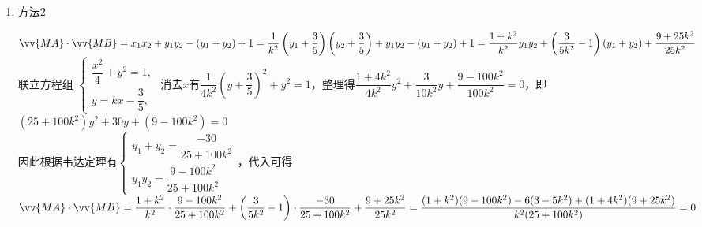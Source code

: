 \begin{enumerate}
\begin{jieda}
\begin{enumerate}
\begin{enumerate}
                $\vv{MA} \cdot \vv{MB} = x_1x_2+(y_1-1)(y_2-1) = x_1x_2+\left(kx_1-\dfrac{8}{5}\right)\left(kx_2-\dfrac{8}{5}\right) = (1+k^2)x_1x_2-\dfrac{8k}{5}(x_1+x_2)+\dfrac{64}{25}$

                联立方程组 $\left\{  \begin{array}{l} \dfrac{{x}^{2}}{4} + {y}^{2} = 1, \\  y = {kx} - \dfrac{3}{5}, \end{array}\right.$ 消去$y$有$x^2+4\left(kx-\dfrac{3}{5}\right) = 4$，整理得$(4k^2+1)x^2-\dfrac{24}{5}kx-\dfrac{64}{25} = 0$

                因此根据韦达定理有$\left\{\begin{array}{l}
                     x_1+x_2 = \dfrac{24k}{5(4k^2+1)} \\
                     x_1x_2 = -\dfrac{64}{25(4k^2+1)}
                \end{array}\right.$，代入可得$\vv{MA} \cdot \vv{MB} =  (1+k^2)x_1x_2-\dfrac{8k}{5}(x_1+x_2)+\dfrac{64}{25} = (1+k^2)\left(-\dfrac{64}{25(4k^2+1)}\right) - \dfrac{8k}{5}\left(\dfrac{24k}{5(4k^2+1)}\right) + \dfrac{64}{25} = 0$
                
            
                \item 方法2
                
                $\vv{MA} \cdot \vv{MB} = x_1x_2 + y_1y_2-(y_1+y_2)+1 = \dfrac{1}{k^2}\left(y_1+\dfrac{3}{5}\right)\left(y_2+\dfrac{3}{5}\right) + y_1y_2-(y_1+y_2)+1 = \dfrac{1+k^2}{k^2}y_1y_2 + \left(\dfrac{3}{5k^2}-1\right)(y_1+y_2)+\dfrac{9+25k^2}{25k^2}$\\
                联立方程组 $\left\{  \begin{array}{l} \dfrac{{x}^{2}}{4} + {y}^{2} = 1, \\  y = {kx} - \dfrac{3}{5}, \end{array}\right.$ 消去$x$有$\dfrac{1}{4k^2}\left(y+\dfrac{3}{5}\right)^2+y^2 = 1$，整理得$\dfrac{1+4k^2}{4k^2}y^2+\dfrac{3}{10k^2}y+\dfrac{9-100k^2}{100k^2} = 0$，即$(25+100k^2)y^2+30y+(9-100k^2) = 0$\\
                因此根据韦达定理有$\left\{\begin{array}{l}
                     y_1+y_2 = \dfrac{-30}{25+100k^2} \\
                     y_1y_2 = \dfrac{9-100k^2}{25+100k^2}
                \end{array}\right.$，代入可得$\vv{MA} \cdot \vv{MB} = \dfrac{1+k^2}{k^2} \cdot \dfrac{9-100k^2}{25+100k^2} + \left(\dfrac{3}{5k^2}-1\right)\cdot \dfrac{-30}{25+100k^2} +\dfrac{9+25k^2}{25k^2} = \dfrac{(1+k^2)(9-100k^2) -6(3-5k^2)+(1+4k^2)(9+25k^2)}{k^2(25+100k^2)} = 0$
            \end{enumerate}
            

\end{enumerate}
\end{jieda}
\end{enumerate}
